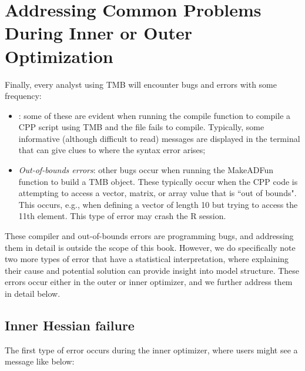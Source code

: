 \section{Addressing Common Problems During Inner or Outer Optimization} \label{sec:Chap2_convergence_problems}

Finally, every analyst using TMB will encounter bugs and errors with some frequency:
\begin{itemize}
    \item {}:  some of these are evident when running the \colorbox{backcolour}{compile} function to compile a CPP script using TMB and the file fails to compile.  Typically, some informative (although difficult to read) messages are displayed in the terminal that can give clues to where the syntax error arises;

    \item \textit{Out-of-bounds errors}:  other bugs occur when running the \colorbox{backcolour}{MakeADFun} function to build a TMB object.  These typically occur when the CPP code is attempting to access a vector, matrix, or array value that is ``out of bounds".  This occurs, e.g., when defining a vector of length 10 but trying to access the 11th element.  This type of error may crash the R session.
\end{itemize}
These compiler and out-of-bounds errors are programming bugs, and addressing them in detail is  outside the scope of this book.  However, we do specifically note two more types of error that have a statistical interpretation, where explaining their cause and potential solution can provide insight into model structure.  These errors occur either in the outer or inner optimizer, and we further address them in detail below.

\subsection{Inner Hessian failure}

The first type of error occurs during the inner optimizer, where users might see a message like below:

